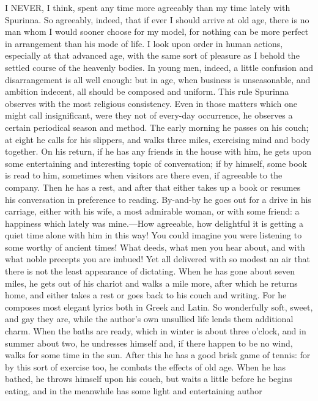 I NEVER, I think, spent any time more agreeably than my time lately with
Spurinna. So agreeably, indeed, that if ever I should arrive at old age,
there is no man whom I would sooner choose for my model, for nothing can
be more perfect in arrangement than his mode of life. I look upon order in
human actions, especially at that advanced age, with the same sort of
pleasure as I behold the settled course of the heavenly bodies. In young
men, indeed, a little confusion and disarrangement is all well enough: but
in age, when business is unseasonable, and ambition indecent, all should
be composed and uniform. This rule Spurinna observes with the most
religious consistency. Even in those matters which one might call
insignificant, were they not of every-day occurrence, he observes a
certain periodical season and method. The early morning he passes on his
couch; at eight he calls for his slippers, and walks three miles,
exercising mind and body together. On his return, if he has any friends in
the house with him, he gets upon some entertaining and interesting topic
of conversation; if by himself, some book is read to him, sometimes when
visitors are there even, if agreeable to the company. Then he has a rest,
and after that either takes up a book or resumes his conversation in
preference to reading. By-and-by he goes out for a drive in his carriage,
either with his wife, a most admirable woman, or with some friend: a
happiness which lately was mine.—How agreeable, how delightful it is
getting a quiet time alone with him in this way! You could imagine you
were listening to some worthy of ancient times! What deeds, what men you
hear about, and with what noble precepts you are imbued! Yet all delivered
with so modest an air that there is not the least appearance of dictating.
When he has gone about seven miles, he gets out of his chariot and walks a
mile more, after which he returns home, and either takes a rest or goes
back to his couch and writing. For he composes most elegant lyrics both in
Greek and Latin. So wonderfully soft, sweet, and gay they are, while the
author's own unsullied life lends them additional charm. When the baths
are ready, which in winter is about three o'clock, and in summer about
two, he undresses himself and, if there happen to be no wind, walks for
some time in the sun. After this he has a good brisk game of tennis: for
by this sort of exercise too, he combats the effects of old age. When he
has bathed, he throws himself upon his couch, but waits a little before he
begins eating, and in the meanwhile has some light and entertaining author
